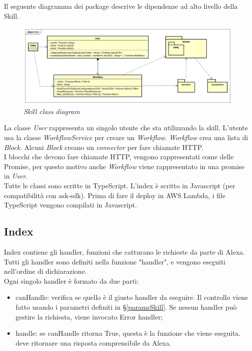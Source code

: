 Il seguente diagramma dei package descrive le dipendenze ad alto livello della Skill.\\
\begin{figure} [h]
    \centering
	\includegraphics[scale=0.35]{./images/ZeroSevenPackageLambda.png}
	\caption{\textit{Skill class diagram}}\label{classlambda}
\end{figure}
\clearpage
La classe \textit{User} rappresenta un singolo utente che sta utilizzando la skill. L'utente usa la classe \textit{WorkflowService} per creare un \textit{Workflow}. \textit{Workflow} crea una lista di \textit{Block}. Alcuni \textit{Block} creano un \textit{connector} per fare chiamate HTTP.\\
I blocchi che devono fare chiamate HTTP, vengono rappresentati come delle Promise, per questo motivo anche \textit{Workflow} viene rappresentato in una promise in \textit{User}.\\
Tutte le classi sono scritte in TypeScript. L'index è scritto in Javascript (per compatibilità con ask-sdk). Prima di fare il deploy in AWS Lambda, i file TypeScript vengono compilati in Javascript.
\subsection{Index}
Index contiene gli handler, funzioni che catturano le richieste da parte di Alexa. Tutti gli handler sono definiti nella funzione "handler", e vengono eseguiti nell'ordine di dichiarazione.\\Ogni singolo handler è formato da due parti:
\begin{itemize}
    \item canHandle: verifica se quello è il giusto handler da eseguire. Il controllo viene fatto usando i parametri definiti in \S\ref{paramsSkill}. Se nessun handler può gestire la richiesta, viene invocato Error handler;
    \item handle: se canHandle ritorna True, questa è la funzione che viene eseguita. deve ritornare una risposta comprensibile da Alexa.
\end{itemize}

